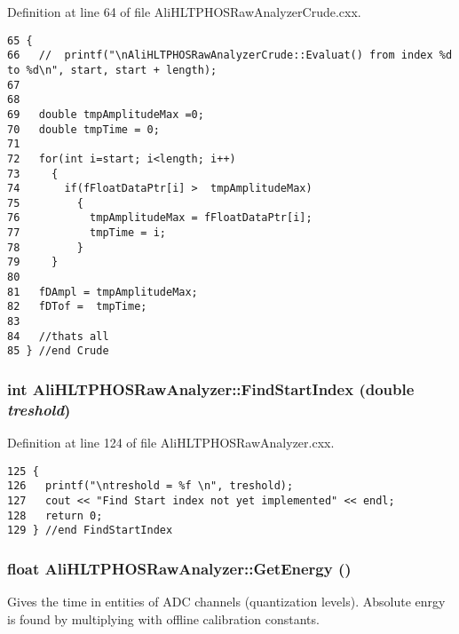 Definition at line 64 of file Ali\-HLTPHOSRaw\-Analyzer\-Crude.cxx.

\footnotesize\begin{verbatim}65 {
66   //  printf("\nAliHLTPHOSRawAnalyzerCrude::Evaluat() from index %d to %d\n", start, start + length);
67   
68   
69   double tmpAmplitudeMax =0; 
70   double tmpTime = 0;
71 
72   for(int i=start; i<length; i++)
73     {
74       if(fFloatDataPtr[i] >  tmpAmplitudeMax)
75         {
76           tmpAmplitudeMax = fFloatDataPtr[i];
77           tmpTime = i;               
78         }
79     }
80         
81   fDAmpl = tmpAmplitudeMax;
82   fDTof =  tmpTime;
83  
84   //thats all 
85 } //end Crude
\end{verbatim}\normalsize 


\subsubsection{\setlength{\rightskip}{0pt plus 5cm}int Ali\-HLTPHOSRaw\-Analyzer::Find\-Start\-Index (double {\em treshold})\hspace{0.3cm}{\tt  [inherited]}}\label{classAliHLTPHOSRawAnalyzer_AliHLTPHOSRawAnalyzerPeakFindera9}




Definition at line 124 of file Ali\-HLTPHOSRaw\-Analyzer.cxx.

\footnotesize\begin{verbatim}125 {
126   printf("\ntreshold = %f \n", treshold);
127   cout << "Find Start index not yet implemented" << endl;
128   return 0;
129 } //end FindStartIndex
\end{verbatim}\normalsize 


\subsubsection{\setlength{\rightskip}{0pt plus 5cm}float Ali\-HLTPHOSRaw\-Analyzer::Get\-Energy ()\hspace{0.3cm}{\tt  [inherited]}}\label{classAliHLTPHOSRawAnalyzer_AliHLTPHOSRawAnalyzerPeakFindera11}


Gives the time in entities of ADC channels (quantization levels). Absolute enrgy is found by multiplying with offline calibration constants. 

